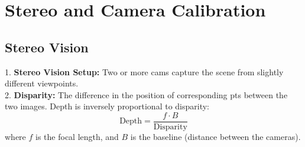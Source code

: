 \section{Stereo and Camera Calibration}

\subsection*{Stereo Vision}
1. \textbf{Stereo Vision Setup:} Two or more cams capture the scene from slightly different viewpoints. \\
2. \textbf{Disparity:} The difference in the position of corresponding pts between the two images. Depth is inversely proportional to disparity:
   \[
   \text{Depth} = \frac{f \cdot B}{\text{Disparity}}
   \]
   where \(f\) is the focal length, and \(B\) is the baseline (distance between the cameras). \\



